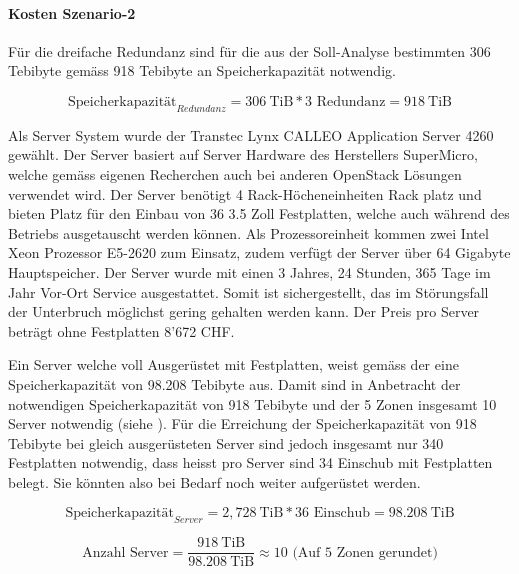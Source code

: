 \paragraph*{Kosten Szenario-2}

Für die dreifache Redundanz sind für die aus der Soll-Analyse bestimmten 306 Tebibyte gemäss  918 Tebibyte an Speicherkapazität notwendig.

\begin{equation}
\mbox{Speicherkapazität}_{Redundanz} = 306 \mathrm{\ TiB} * 3 \mbox{\ Redundanz} = 918 \mathrm{\ TiB}
\label{eqn:SpeicherkapazitätS2}
\end{equation}


Als Server System wurde der Transtec Lynx CALLEO Application Server 4260 gewählt. Der Server basiert auf Server Hardware des Herstellers SuperMicro, welche gemäss eigenen Recherchen auch bei anderen OpenStack Lösungen verwendet wird. Der Server benötigt 4 Rack-Höcheneinheiten Rack platz und bieten Platz für den Einbau von 36 3.5 Zoll Festplatten, welche auch während des Betriebs ausgetauscht werden können. Als Prozessoreinheit kommen zwei Intel Xeon Prozessor E5-2620 zum Einsatz, zudem verfügt der Server über 64 Gigabyte Hauptspeicher. Der Server wurde mit einen 3 Jahres, 24 Stunden, 365 Tage im Jahr Vor-Ort Service ausgestattet. Somit ist sichergestellt, das im Störungsfall der Unterbruch möglichst gering gehalten werden kann. Der Preis pro Server beträgt ohne Festplatten 8'672 CHF.


Ein Server welche voll Ausgerüstet mit Festplatten, weist gemäss der  eine Speicherkapazität von 98.208 Tebibyte aus. Damit sind in Anbetracht der notwendigen Speicherkapazität von 918 Tebibyte und der 5 Zonen insgesamt 10 Server notwendig (siehe ). Für die Erreichung der Speicherkapazität von 918 Tebibyte bei gleich ausgerüsteten Server sind jedoch insgesamt nur 340 Festplatten notwendig, dass heisst pro Server sind 34 Einschub mit Festplatten belegt. Sie könnten also bei Bedarf noch weiter aufgerüstet werden.

\begin{equation}
\mbox{Speicherkapazität}_{Server} = 2,728 \mathrm{\ TiB} * 36 \mbox{\ Einschub} = 98.208 \mathrm{\ TiB}
\label{eqn:SpeicherkapazitätServerS2}
\end{equation}

\begin{equation}
\mbox{Anzahl Server} = \frac{918 \mathrm{\ TiB}}{98.208 \mathrm{\ TiB}} \approx 10 \mbox{\ (Auf 5 Zonen gerundet)}
\label{eqn:AnzahlServerS2}
\end{equation}

